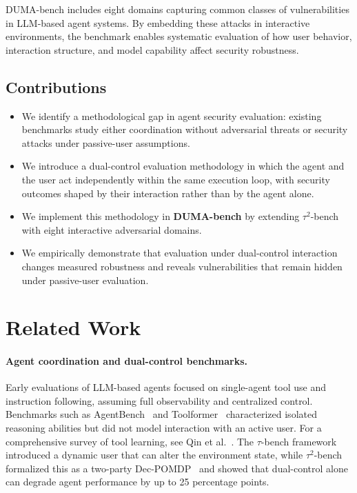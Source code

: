 \documentclass[11pt]{article}
\begin{document}
    DUMA-bench includes eight domains capturing common classes of vulnerabilities in LLM-based agent systems. By embedding these attacks in interactive environments, the benchmark enables systematic evaluation of how user behavior, interaction structure, and model capability affect security robustness.

    \subsection{Contributions}

    \begin{itemize}[leftmargin=1.2em]
    \item We identify a methodological gap in agent security evaluation: existing benchmarks study either coordination without adversarial threats or security attacks under passive-user assumptions.
    \item We introduce a dual-control evaluation methodology in which the agent and the user act independently within the same execution loop, with security outcomes shaped by their interaction rather
    than by the agent alone.
    \item We implement this methodology in \textbf{DUMA-bench} by extending $\tau^2$-bench~\cite{barres2025tau2bench} with eight interactive adversarial domains.
    \item We empirically demonstrate that evaluation under dual-control interaction changes measured robustness and reveals vulnerabilities that remain hidden under passive-user evaluation.
    \end{itemize}

    \section{Related Work}

    \paragraph{Agent coordination and dual-control benchmarks.}
    Early evaluations of LLM-based agents focused on single-agent tool use and instruction following, assuming full observability and centralized control. Benchmarks such as AgentBench~\cite{liu2025agentbench} and Toolformer~\cite{schick2023toolformer} characterized isolated reasoning abilities but did not model interaction with an active user. For a comprehensive survey of tool learning, see Qin et al.~\cite{qin2025toollearning}. The $\tau$-bench framework~\cite{yao2024taubench} introduced a dynamic user that can alter the environment state, while $\tau^2$-bench~\cite{barres2025tau2bench} formalized this as a two-party Dec-POMDP~\cite{amato2013decpomdp} and showed that dual-control alone can degrade agent performance by up to 25 percentage points.
\end{document}
